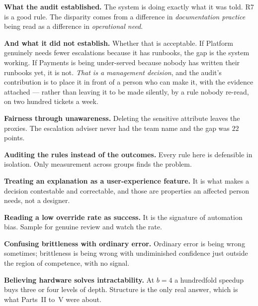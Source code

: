 \begin{worked}
\smallskip
\textbf{What the audit established.} The system is doing exactly what it was told.
R7 is a good rule. The disparity comes from a difference in \emph{documentation
practice} being read as a difference in \emph{operational need}.

\smallskip
\textbf{And what it did not establish.} Whether that is acceptable. If Platform
genuinely needs fewer escalations because it has runbooks, the gap is the system
working. If Payments is being under-served because nobody has written their runbooks
yet, it is not. \emph{That is a management decision}, and the audit's contribution
is to place it in front of a person who can make it, with the evidence attached ---
rather than leaving it to be made silently, by a rule nobody re-read, on two hundred
tickets a week.
\end{worked}

\begin{pitfall}
\begin{tight}
  \item \textbf{Fairness through unawareness.} Deleting the sensitive attribute
        leaves the proxies. The escalation adviser never had the team name and the
        gap was $22$ points.
  \item \textbf{Auditing the rules instead of the outcomes.} Every rule here is
        defensible in isolation. Only measurement across groups finds the problem.
  \item \textbf{Treating an explanation as a user-experience feature.} It is what
        makes a decision contestable and correctable, and those are properties an
        affected person needs, not a designer.
  \item \textbf{Reading a low override rate as success.} It is the signature of
        automation bias. Sample for genuine review and watch the rate.
  \item \textbf{Confusing brittleness with ordinary error.} Ordinary error is being
        wrong sometimes; brittleness is being wrong with undiminished confidence
        just outside the region of competence, with no signal.
  \item \textbf{Believing hardware solves intractability.} At $b=4$ a hundredfold
        speedup buys three or four levels of depth. Structure is the only real
        answer, which is what Parts~II to~V were about.
\end{tight}
\end{pitfall}

